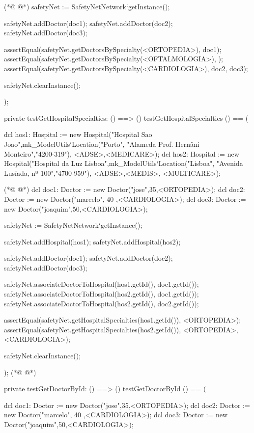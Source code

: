 \begin{vdmpp}[breaklines=true]
(*@
\label{testGetDoctorById:495}
@*)
  safetyNet := SafetyNetNetwork`getInstance();
  
  safetyNet.addDoctor(doc1);
  safetyNet.addDoctor(doc2);
  safetyNet.addDoctor(doc3);

  assertEqual(safetyNet.getDoctorsBySpecialty(<ORTOPEDIA>), {doc1});
  assertEqual(safetyNet.getDoctorsBySpecialty(<OFTALMOLOGIA>), {});
  assertEqual(safetyNet.getDoctorsBySpecialty(<CARDIOLOGIA>), {doc2, doc3});  
  
  safetyNet.clearInstance();
    
);

private testGetHospitalSpecialties: () ==> ()
 testGetHospitalSpecialties () == (
 
  dcl hos1: Hospital := new Hospital("Hospital Sao Joao",mk_ModelUtils`Location("Porto", "Alameda Prof. Hernâni Monteiro","4200-319"), {<ADSE>,<MEDICARE>});
  dcl hos2: Hospital := new Hospital("Hospital da Luz Lisboa",mk_ModelUtils`Location("Lisboa", "Avenida Lusíada, nº 100","4700-959"), {<ADSE>,<MEDIS>, <MULTICARE>});
  
(*@
\label{testAddPatient:515}
@*)
  dcl doc1: Doctor := new Doctor("jose",35,<ORTOPEDIA>);
  dcl doc2: Doctor := new Doctor("marcelo", 40 ,<CARDIOLOGIA>);
  dcl doc3: Doctor := new Doctor("joaquim",50,<CARDIOLOGIA>);
  
  safetyNet := SafetyNetNetwork`getInstance();
   
  safetyNet.addHospital(hos1);
  safetyNet.addHospital(hos2);
  
  safetyNet.addDoctor(doc1);
  safetyNet.addDoctor(doc2);
  safetyNet.addDoctor(doc3);

  safetyNet.associateDoctorToHospital(hos1.getId(), doc1.getId());
  safetyNet.associateDoctorToHospital(hos2.getId(), doc1.getId());
  safetyNet.associateDoctorToHospital(hos2.getId(), doc2.getId());

  assertEqual(safetyNet.getHospitalSpecialties(hos1.getId()), {<ORTOPEDIA>});
  assertEqual(safetyNet.getHospitalSpecialties(hos2.getId()), {<ORTOPEDIA>, <CARDIOLOGIA>});  
  
  safetyNet.clearInstance();
    
);
(*@
\label{testRemovePatient:538}
@*)

private testGetDoctorById: () ==> ()
 testGetDoctorById () == (
   
  dcl doc1: Doctor := new Doctor("jose",35,<ORTOPEDIA>);
  dcl doc2: Doctor := new Doctor("marcelo", 40 ,<CARDIOLOGIA>);
  dcl doc3: Doctor := new Doctor("joaquim",50,<CARDIOLOGIA>);
  

\end{vdmpp}
